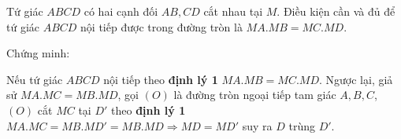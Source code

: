 \begin{dang}
	\begin{dl}
		Tứ giác $ABCD$ có hai cạnh đối $AB,CD$ cắt nhau tại $M$. Điều kiện cần và đủ để tứ giác $ABCD$ nội tiếp được trong đường tròn là $MA.MB=MC.MD$. 
	\end{dl}
	Chứng minh: 
	\begin{center}
	\end{center}
	Nếu tứ giác $ABCD$ nội tiếp theo \textbf{định lý 1} $MA.MB=MC.MD$. Ngược lại, giả sử $MA.MC=MB.MD$, gọi $(O)$ là đường tròn ngoại tiếp tam giác $A,B,C$, $(O)$ cắt $MC$ tại $D'$ theo \textbf{định lý 1} $MA.MC=MB.MD' = MB.MD\Rightarrow  MD=MD'$ suy ra $D$ trùng $D'$.
	

\end{dang}
